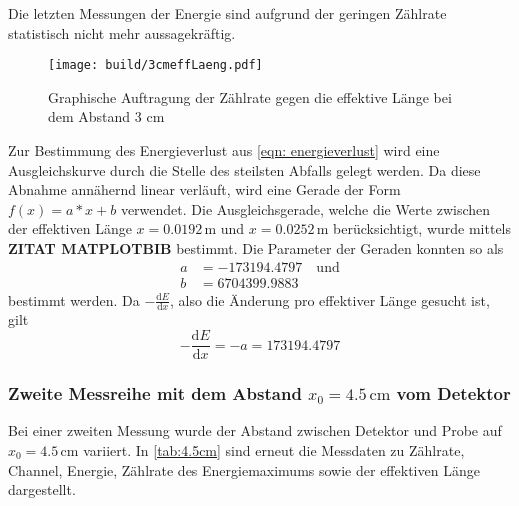 Die letzten Messungen der Energie sind aufgrund der geringen Zählrate statistisch nicht mehr aussagekräftig.
\begin{figure}
  \centering
  \texttt{[image: build/3cmeffLaeng.pdf]}
  \caption{Graphische Auftragung der Zählrate gegen die effektive Länge bei dem Abstand 3 $\unit{\cm}$}
  \label{fig:3graph}
\end{figure}
Zur Bestimmung des Energieverlust aus \autoref{eqn: energieverlust} wird eine Ausgleichskurve durch die Stelle des steilsten Abfalls gelegt werden.
Da diese Abnahme annähernd linear verläuft, wird eine Gerade der Form $f(x)=a*x+b$ verwendet.
Die Ausgleichsgerade, welche die Werte zwischen der effektiven Länge $x= 0.0192\, \unit{\meter}$ und $x= 0.0252 \, \unit{\meter}$ berücksichtigt, wurde mittels \textbf{ZITAT MATPLOTBIB} bestimmt.
Die Parameter der Geraden konnten so als
\begin{align*}
  a&=-173194.4797 \quad \text{und}\\
  b&= 6704399.9883
\end{align*}
bestimmt werden.
Da $-\frac{\text{d}E}{\text{d}x}$, also die Änderung pro effektiver Länge gesucht ist, gilt
\begin{equation*}
  -\frac{\text{d}E}{\text{d}x}=-a=173194.4797
\end{equation*}


\subsubsection{Zweite Messreihe mit dem Abstand $x_0= 4.5\, \unit{\cm}$ vom Detektor}
Bei einer zweiten Messung wurde der Abstand zwischen Detektor und Probe auf $x_0 = 4.5 \,\unit{\cm}$ variiert. In \autoref{tab:4.5cm} sind erneut die 
Messdaten zu Zählrate, Channel, Energie, Zählrate des Energiemaximums sowie der effektiven Länge dargestellt.

